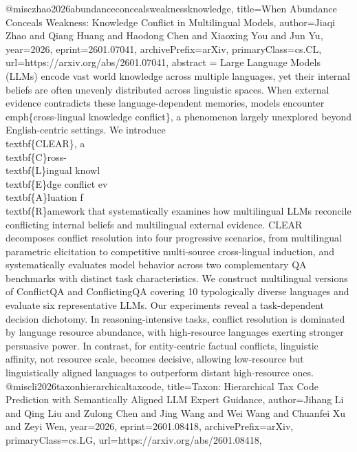 {}@misc{zhao2026abundanceconcealsweaknessknowledge,
      title={When Abundance Conceals Weakness: Knowledge Conflict in Multilingual Models}, 
      author={Jiaqi Zhao and Qiang Huang and Haodong Chen and Xiaoxing You and Jun Yu},
      year={2026},
      eprint={2601.07041},
      archivePrefix={arXiv},
      primaryClass={cs.CL},
      url={https://arxiv.org/abs/2601.07041},
      abstract = {Large Language Models (LLMs) encode vast world knowledge across multiple languages, yet their internal beliefs are often unevenly distributed across linguistic spaces. When external evidence contradicts these language-dependent memories, models encounter \\emph\{cross-lingual knowledge conflict\}, a phenomenon largely unexplored beyond English-centric settings. We introduce \\textbf\{CLEAR\}, a \\textbf\{C\}ross-\\textbf\{L\}ingual knowl\\textbf\{E\}dge conflict ev\\textbf\{A\}luation f\\textbf\{R\}amework that systematically examines how multilingual LLMs reconcile conflicting internal beliefs and multilingual external evidence. CLEAR decomposes conflict resolution into four progressive scenarios, from multilingual parametric elicitation to competitive multi-source cross-lingual induction, and systematically evaluates model behavior across two complementary QA benchmarks with distinct task characteristics. We construct multilingual versions of ConflictQA and ConflictingQA covering 10 typologically diverse languages and evaluate six representative LLMs. Our experiments reveal a task-dependent decision dichotomy. In reasoning-intensive tasks, conflict resolution is dominated by language resource abundance, with high-resource languages exerting stronger persuasive power. In contrast, for entity-centric factual conflicts, linguistic affinity, not resource scale, becomes decisive, allowing low-resource but linguistically aligned languages to outperform distant high-resource ones.}
}@misc{li2026taxonhierarchicaltaxcode,
      title={Taxon: Hierarchical Tax Code Prediction with Semantically Aligned LLM Expert Guidance}, 
      author={Jihang Li and Qing Liu and Zulong Chen and Jing Wang and Wei Wang and Chuanfei Xu and Zeyi Wen},
      year={2026},
      eprint={2601.08418},
      archivePrefix={arXiv},
      primaryClass={cs.LG},
      url={https://arxiv.org/abs/2601.08418},
}

